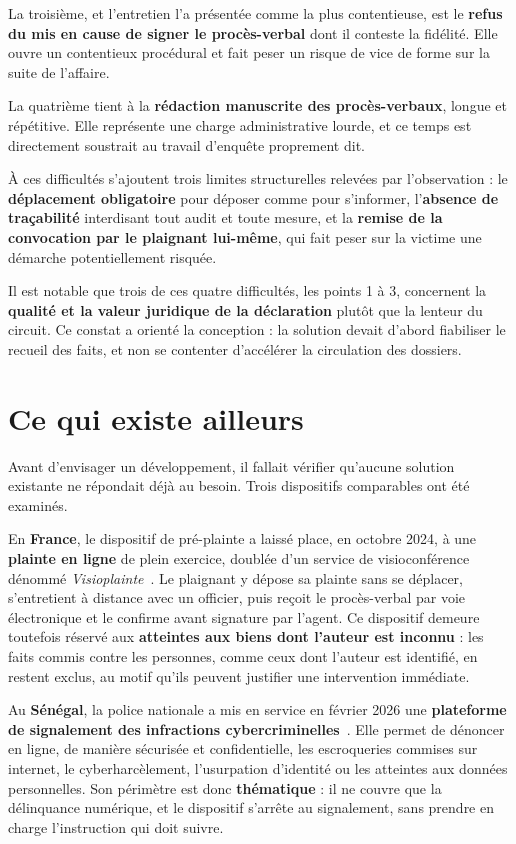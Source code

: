La troisième, et l'entretien l'a présentée comme la plus contentieuse, est le \textbf{refus du mis en cause de signer le procès-verbal} dont il conteste la fidélité. Elle ouvre un contentieux procédural et fait peser un risque de vice de forme sur la suite de l'affaire.

La quatrième tient à la \textbf{rédaction manuscrite des procès-verbaux}, longue et répétitive. Elle représente une charge administrative lourde, et ce temps est directement soustrait au travail d'enquête proprement dit.

À ces difficultés s'ajoutent trois limites structurelles relevées par l'observation : le \textbf{déplacement obligatoire} pour déposer comme pour s'informer, l'\textbf{absence de traçabilité} interdisant tout audit et toute mesure, et la \textbf{remise de la convocation par le plaignant lui-même}, qui fait peser sur la victime une démarche potentiellement risquée.

Il est notable que trois de ces quatre difficultés, les points 1 à 3, concernent la \textbf{qualité et la valeur juridique de la déclaration} plutôt que la lenteur du circuit. Ce constat a orienté la conception : la solution devait d'abord fiabiliser le recueil des faits, et non se contenter d'accélérer la circulation des dossiers.

\section{Ce qui existe ailleurs}

Avant d'envisager un développement, il fallait vérifier qu'aucune solution existante ne répondait déjà au besoin. Trois dispositifs comparables ont été examinés.

En \textbf{France}, le dispositif de pré-plainte a laissé place, en octobre 2024, à une \textbf{plainte en ligne} de plein exercice, doublée d'un service de visioconférence dénommé \textit{Visioplainte}~\cite{france-visioplainte}. Le plaignant y dépose sa plainte sans se déplacer, s'entretient à distance avec un officier, puis reçoit le procès-verbal par voie électronique et le confirme avant signature par l'agent. Ce dispositif demeure toutefois réservé aux \textbf{atteintes aux biens dont l'auteur est inconnu} : les faits commis contre les personnes, comme ceux dont l'auteur est identifié, en restent exclus, au motif qu'ils peuvent justifier une intervention immédiate.

Au \textbf{Sénégal}, la police nationale a mis en service en février 2026 une \textbf{plateforme de signalement des infractions cybercriminelles}~\cite{senegal-psic}. Elle permet de dénoncer en ligne, de manière sécurisée et confidentielle, les escroqueries commises sur internet, le cyberharcèlement, l'usurpation d'identité ou les atteintes aux données personnelles. Son périmètre est donc \textbf{thématique} : il ne couvre que la délinquance numérique, et le dispositif s'arrête au signalement, sans prendre en charge l'instruction qui doit suivre.

